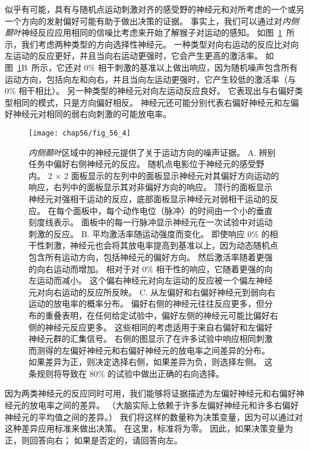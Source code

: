 似乎有可能，具有与随机点运动刺激对齐的感受野的神经元和对所考虑的一个或另一个方向的发射偏好可能有助于做出决策的证据。
事实上，我们可以通过对\textit{内侧颞叶}神经反应应用相同的信噪比考虑来开始了解猴子对运动的感知。
如图~\ref{fig:56_4}~所示，我们考虑两种类型的方向选择性神经元。
一种类型对向右运动的反应比对向左运动的反应更好，并且当向右运动更强时，它会产生更高的激活率。
如图~\ref{fig:56_4}B~所示，它还对 0\% 相干刺激的基准以上做出响应，因为随机噪声包含所有运动方向，包括向左和向右，并且当向左运动更强时，它产生较低的激活率（与 0\% 相干相比）。
另一种类型的神经元对向左运动反应良好。
它表现出与右偏好类型相同的模式，只是方向偏好相反。
神经元还可能分别代表右偏好神经元和左偏好神经元对相同的弱右向刺激的可能放电率。


\begin{figure}[htbp]
	\centering
	\texttt{[image: chap56/fig\_56\_4]}
	\caption{\textit{内侧颞叶}区域中的神经元提供了关于运动方向的噪声证据。
		A. 辨别任务中偏好右侧神经元的反应。
		随机点电影位于神经元的感受野内。
		2 × 2 面板显示的左列中的面板显示神经元对其偏好方向运动的响应，右列中的面板显示其对非偏好方向的响应。
		顶行的面板显示神经元对强相干运动的反应，底部面板显示神经元对弱相干运动的反应。
		在每个面板中，每个动作电位（脉冲）的时间由一个小的垂直刻度线表示。
		面板中的每一行脉冲显示神经元在一次试验中对运动刺激的反应\cite{mazurek2003role}。
		B. 平均激活率随运动强度而变化。
		即使响应 0\% 的相干性刺激，神经元也会将其放电率提高到基准以上，因为动态随机点包含所有运动方向，包括神经元的偏好方向。
		然后激活率随着更强的向右运动而增加。
		相对于对 0\% 相干性的响应，它随着更强的向左运动而减小。
		这个偏右神经元对向左运动的反应被一个偏左神经元对向右运动的反应所反映。
		C. 从左偏好和右偏好神经元到弱向右运动的放电率的概率分布。
		偏好右侧的神经元往往反应更多，但分布的重叠表明，在任何给定试验中，偏好左侧的神经元可能比偏好右侧的神经元反应更多。
		这些相同的考虑适用于来自右偏好和左偏好神经元群的汇集信号。
		右侧的图显示了在许多试验中响应相同刺激而测得的左偏好神经元和右偏好神经元的放电率之间差异的分布。
		如果差异为正，则决定选择右侧，如果差异为负，则选择左侧。
		这条规则将导致在 80\% 的试验中做出正确的右向选择。}
	\label{fig:56_4}
\end{figure}


因为两类神经元的反应同时可用，我们能够将证据描述为左偏好神经元和右偏好神经元的放电率之间的差异。
（大脑实际上依赖于许多左偏好神经元和许多右偏好神经元的平均值之间的差异。）
我们将这样的数量称为决策变量，因为可以通过对这种差异应用标准来做出决策。
在这里，标准将为零。
因此，如果决策变量为正，则回答向右；
如果是否定的，请回答向左。


